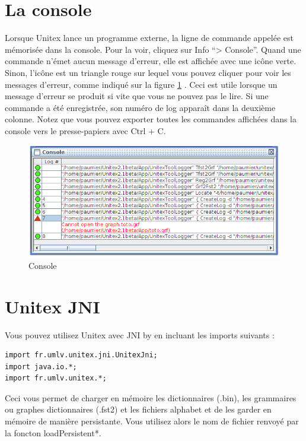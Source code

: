 \section{La console}
\label{section-console}
Lorsque Unitex lance un programme externe, la ligne de commande appelée est mémorisée dans la
console. Pour la voir, cliquez sur Info ``> Console''. Quand une commande n'émet aucun message
d'erreur, elle est affichée avec une icône verte. Sinon, l'icône est un triangle rouge sur lequel
vous pouvez cliquer pour voir les messages d'erreur, comme indiqué sur la figure \ref{fig-console}
. Ceci est utile lorsque un message d'erreur se produit si vite que vous ne pouvez pas le lire. Si
une commande a été enregistrée, son numéro de log apparaît dans la deuxième colonne. Notez que vous
pouvez exporter toutes les commandes affichées dans la console vers le presse-papiers avec Ctrl + C.

\bigskip
\begin{figure}[!h]
\begin{center}
\includegraphics[width=15cm]{resources/img/fig11-2.png}
\caption{Console\label{fig-console}}
\end{center}
\end{figure}

\section{Unitex JNI}
\label{section-unitex-JNI}

Vous pouvez utilisez Unitex avec JNI by en incluant les imports suivants : 
\begin{verbatim}
import fr.umlv.unitex.jni.UnitexJni;
import java.io.*;
import fr.umlv.unitex.*;
\end{verbatim}
Ceci vous permet de charger en mémoire les dictionnaires (.bin), les grammaires ou graphes dictionnaires (.fst2) et les fichiers alphabet et de les garder en mémoire de manière persistante. Vous utilisez alors le nom de fichier renvoyé par la foncton loadPersistent*.

